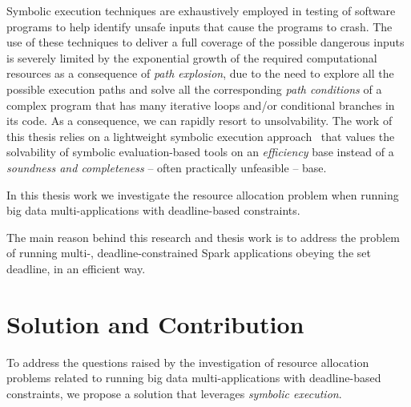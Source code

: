 Symbolic execution techniques are exhaustively employed in testing of software programs to help identify unsafe inputs that cause the programs to crash. The use of these techniques to deliver a  full coverage of the possible dangerous inputs is severely limited by the exponential growth of the required computational resources as a consequence of \textit{path explosion}, due to the need to explore all the possible execution paths and solve all the corresponding \textit{path conditions} of a complex program that has many iterative loops and/or conditional branches in its code. As a consequence, we can rapidly resort to unsolvability. The work of this thesis relies on a lightweight symbolic execution  approach~\cite{Baresi-Quattrocchi-Denaro:2019} that values the solvability of symbolic evaluation-based tools on an \textit{efficiency} base instead of a \textit{soundness and completeness} -- often practically unfeasible -- base.

In this thesis work we investigate the resource allocation problem when running big data multi-\plan applications with deadline-based \qos constraints. 

The main reason behind this research and thesis work is to address the problem of running multi-\plan, deadline-constrained Spark applications obeying the set deadline, in an efficient way.

\section{Solution and Contribution}\label{sec:solution_contribution}
To address the questions raised by the investigation of resource allocation problems related to running big data multi-\plan applications with deadline-based \qos constraints, we propose a solution that leverages \textit{symbolic execution}. 

